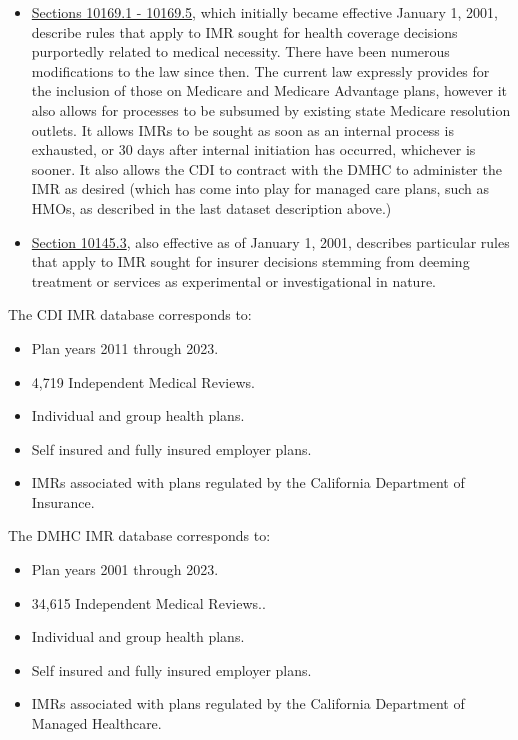 \documentclass[12pt, a4paper,twoside]{report}
\theoremstyle{plain} %
\theoremstyle{definition} %
\theoremstyle{remark} %
\numberwithin{equation}{chapter}
\begin{document}
\begin{itemize}
\begin{tcolorbox}
\begin{itemize}
				
				\item \href{https://leginfo.legislature.ca.gov/faces/codes_displayText.xhtml?lawCode=INS&division=2.&title=&part=2.&chapter=1.&article=3.5.}{Sections 10169.1 - 10169.5}, which initially became effective January 1, 2001, describe rules that apply to IMR sought for health coverage decisions purportedly related to medical necessity. There have been numerous modifications to the law since then. The current law expressly provides for the inclusion of those on Medicare and Medicare Advantage plans, however it also allows for processes to be subsumed by existing state Medicare resolution outlets. It allows IMRs to be sought as soon as an internal process is exhausted, or 30 days after internal initiation has occurred, whichever is sooner. It also allows the CDI to contract with the DMHC to administer the IMR as desired (which has come into play for managed care plans, such as HMOs, as described in the last dataset description above.)\\
				
				\item \href{https://leginfo.legislature.ca.gov/faces/codes_displaySection.xhtml?lawCode=INS&sectionNum=10145.3.}{Section 10145.3}, also effective as of January 1, 2001, describes particular rules that apply to IMR sought for insurer decisions stemming from deeming treatment or services as experimental or investigational in nature.\\
				
			\end{itemize}
		
			The CDI IMR database corresponds to:
			
			\begin{itemize}
				\item Plan years 2011 through 2023.
				\item 4,719 Independent Medical Reviews.
				\item Individual and group health plans.
				\item Self insured and fully insured employer plans.
				\item IMRs associated with plans regulated by the California Department of Insurance.
			\end{itemize}
			
			The DMHC IMR database corresponds to:
		
			\begin{itemize}
				\item Plan years 2001 through 2023.
				\item 34,615 Independent Medical Reviews..
				\item Individual and group health plans.
				\item Self insured and fully insured employer plans.
				\item IMRs associated with plans regulated by the California Department of Managed Healthcare.
			\end{itemize}
			

\end{tcolorbox}
\end{itemize}
\end{document}

